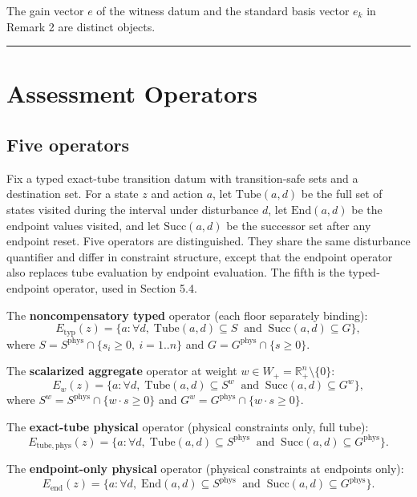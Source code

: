 \documentclass[review,11pt]{elsarticle}
\begin{document}
The gain vector \(e\) of the witness datum and the standard basis vector \(e_k\) in Remark 2 are distinct objects.

\begin{center}\rule{0.5\linewidth}{0.5pt}\end{center}

\section{Assessment Operators}\label{assessment-operators}

\subsection{Five operators}\label{five-operators}

Fix a typed exact-tube transition datum with transition-safe sets and a
destination set. For a state \(z\) and action \(a\), let
\(\mathrm{Tube}(a,d)\) be the full set of states visited during the
interval under disturbance \(d\), let \(\mathrm{End}(a,d)\) be the
endpoint values visited, and let \(\mathrm{Succ}(a,d)\) be the successor
set after any endpoint reset. Five operators are distinguished. They share the same disturbance quantifier and differ in constraint structure, except that the endpoint operator also replaces tube evaluation by endpoint evaluation. The fifth is the typed-endpoint operator, used in Section 5.4.

The \textbf{noncompensatory typed} operator (each floor separately
binding):
\[E_{\mathrm{typ}}(z) = \{ a : \forall d,\; \mathrm{Tube}(a,d) \subseteq S \ \text{ and } \ \mathrm{Succ}(a,d) \subseteq G \},\]
where \(S = S^{\mathrm{phys}} \cap \{ s_i \ge 0,\ i = 1..n \}\) and
\(G = G^{\mathrm{phys}} \cap \{ s \ge 0 \}\).

The \textbf{scalarized aggregate} operator at weight
\(w \in W_+ = \mathbb{R}^n_+ \setminus \{0\}\):
\[E_w(z) = \{ a : \forall d,\; \mathrm{Tube}(a,d) \subseteq S^w \ \text{ and } \ \mathrm{Succ}(a,d) \subseteq G^w \},\]
where \(S^w = S^{\mathrm{phys}} \cap \{ w \cdot s \ge 0 \}\) and
\(G^w = G^{\mathrm{phys}} \cap \{ w \cdot s \ge 0 \}\).

The \textbf{exact-tube physical} operator (physical constraints only,
full tube):
\[E_{\mathrm{tube,phys}}(z) = \{ a : \forall d,\; \mathrm{Tube}(a,d) \subseteq S^{\mathrm{phys}} \ \text{ and } \ \mathrm{Succ}(a,d) \subseteq G^{\mathrm{phys}} \}.\]

The \textbf{endpoint-only physical} operator (physical constraints at
endpoints only):
\[E_{\mathrm{end}}(z) = \{ a : \forall d,\; \mathrm{End}(a,d) \subseteq S^{\mathrm{phys}} \ \text{ and } \ \mathrm{Succ}(a,d) \subseteq G^{\mathrm{phys}} \}.\]
\end{document}
